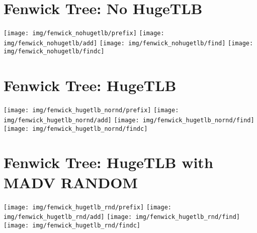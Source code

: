 \documentclass{article}
\begin{document}
\section*{Fenwick Tree: No HugeTLB}

\begin{center}
\texttt{[image: img/fenwick\_nohugetlb/prefix]}
\texttt{[image: img/fenwick\_nohugetlb/add]}
\texttt{[image: img/fenwick\_nohugetlb/find]}
\texttt{[image: img/fenwick\_nohugetlb/findc]}
\end{center}

\section*{Fenwick Tree: HugeTLB}

\begin{center}
\texttt{[image: img/fenwick\_hugetlb\_nornd/prefix]}
\texttt{[image: img/fenwick\_hugetlb\_nornd/add]}
\texttt{[image: img/fenwick\_hugetlb\_nornd/find]}
\texttt{[image: img/fenwick\_hugetlb\_nornd/findc]}
\end{center}

\section*{Fenwick Tree: HugeTLB with MADV RANDOM}

\begin{center}
\texttt{[image: img/fenwick\_hugetlb\_rnd/prefix]}
\texttt{[image: img/fenwick\_hugetlb\_rnd/add]}
\texttt{[image: img/fenwick\_hugetlb\_rnd/find]}
\texttt{[image: img/fenwick\_hugetlb\_rnd/findc]}
\end{center}
\end{document}
